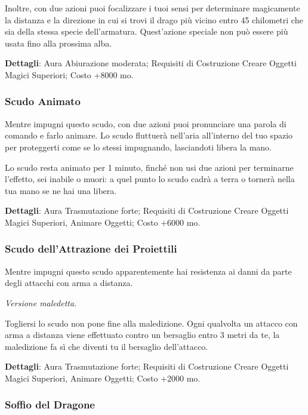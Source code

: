 \begin{multicols}{2}
Inoltre, con due azioni puoi focalizzare i tuoi sensi per determinare magicamente la distanza e la direzione in cui si trovi il drago più vicino entro 45 chilometri che sia della stessa specie dell'armatura. Quest'azione speciale non può essere più usata fino alla prossima alba.

\textbf{Dettagli}: Aura Abiurazione moderata; Requisiti di Costruzione Creare Oggetti Magici Superiori; Costo +8000 mo.

\subsubsection*{Scudo Animato}

Mentre impugni questo scudo, con due azioni puoi pronunciare una parola di comando e farlo animare. Lo scudo fluttuerà nell'aria all'interno del tuo spazio per proteggerti come se lo stessi impugnando, lasciandoti libera la mano.

Lo scudo resta animato per 1 minuto, finché non usi due azioni per terminarne l'effetto, sei inabile o muori: a quel punto lo scudo cadrà a terra o tornerà nella tua mano se ne hai una libera.

\textbf{Dettagli}: Aura Trasmutazione forte; Requisiti di Costruzione Creare Oggetti Magici Superiori, Animare Oggetti; Costo +6000 mo.

\subsubsection*{Scudo dell'Attrazione dei Proiettili}

Mentre impugni questo scudo apparentemente hai resistenza ai danni da parte degli attacchi con arma a distanza.

\textit{Versione maledetta}.

Togliersi lo scudo non pone fine alla maledizione. Ogni qualvolta un attacco con arma a distanza viene effettuato contro un bersaglio entro 3 metri da te, la maledizione fa sì che diventi tu il bersaglio dell'attacco.

\textbf{Dettagli}: Aura Trasmutazione forte; Requisiti di Costruzione Creare Oggetti Magici Superiori, Animare Oggetti; Costo +2000 mo.


\subsubsection*{Soffio del Dragone}


\end{multicols}
